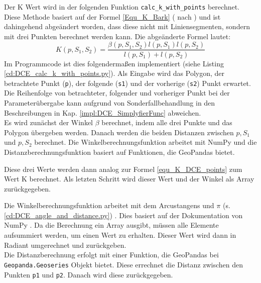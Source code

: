 {	Der K Wert wird in der folgenden Funktion \lstinline|calc_k_with_points| berechnet. Diese Methode basiert auf der Formel \ref{Equ_K_Bark} ( nach \citet{Latecki1999a}) und ist dahingehend abgeändert worden, dass diese nicht mit Liniensegmenten, sondern mit drei Punkten berechnet werden kann. Die abgeänderte Formel lautet:
	\begin{equation}
		K(p,S_1,S_2) = \frac{\beta(p, S_1, S_2)l(p, S_1)l(p, S_2)}{l(p, S_1) + l(p, S_2)} 
		\label{equ_K_DCE_points}
	\end{equation}
	Im Programmcode ist dies folgendermaßen implementiert (siehe Listing \ref{cd:DCE_calc_k_with_points.py}). Als Eingabe wird das Polygon, der betrachtete Punkt (\lstinline|p|), der folgende (\lstinline|s1|) und der vorherige (\lstinline|s2|) Punkt erwartet. Die Reihenfolge von betrachteter, folgender und vorheriger Punkt bei der Parameterübergabe kann aufgrund von Sonderfallbehandlung in den Beschreibungen in Kap. \ref{impl:DCE_SimplyfierFunc} abweichen. \\ 
	Es wird zunächst der Winkel $\beta$ berechnet, indem alle drei Punkte und das Polygon übergeben werden. Danach werden die beiden Distanzen zwischen $p, S_1$ und $p, S_2$ berechnet. Die Winkelberechnungsfunktion arbeitet mit NumPy und die Distanzberechnungsfunktion basiert auf Funktionen, die GeoPandas bietet.
	
	Diese drei Werte werden dann analog zur Formel \ref{equ_K_DCE_points} zum Wert K berechnet. Als letzten Schritt wird dieser Wert und der Winkel als Array zurückgegeben.
	
	Die Winkelberechnungsfunktion arbeitet mit dem Arcustangens und $\pi$ \ifimportant (s. \ref{cd:DCE_angle_and_distance.py}) \fi. Dies basiert auf der Dokumentation von NumPy \citep{numpy_angle}. Da die Berechnung ein Array ausgibt, müssen alle Elemente aufsummiert werden, um einen Wert zu erhalten. Dieser Wert wird dann in Radiant umgerechnet und zurückgeben. \\
	Die Distanzberechnung erfolgt mit einer Funktion, die GeoPandas bei \lstinline|Geopanda.Geoseries| Objekt bietet. Diese errechnet die Distanz zwischen den Punkten \lstinline|p1| und \lstinline|p2|. Danach wird diese zurückgegeben.
	\ifimportant
	
	\fi

}
